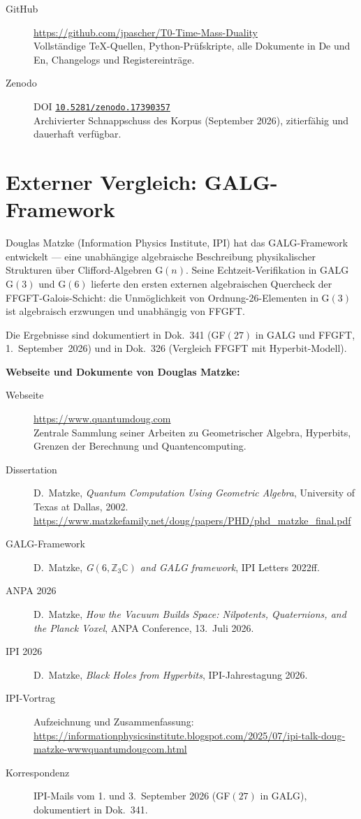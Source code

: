 \documentclass[11pt,oneside]{book}
\begin{document}
\begin{description}
  \item[GitHub] \url{https://github.com/jpascher/T0-Time-Mass-Duality}\\
    Vollständige TeX-Quellen, Python-Prüfskripte, alle Dokumente
    in De und En, Changelogs und Registereinträge.
  \item[Zenodo] DOI \href{https://doi.org/10.5281/zenodo.17390357}{\texttt{10.5281/zenodo.17390357}}\\
    Archivierter Schnappschuss des Korpus (September 2026),
    zitierfähig und dauerhaft verfügbar.
\end{description}

\section*{Externer Vergleich: GALG-Framework}

Douglas Matzke (Information Physics Institute, IPI) hat das GALG-Framework
entwickelt --- eine unabhängige algebraische Beschreibung physikalischer
Strukturen über Clifford-Algebren G$(n)$. Seine Echtzeit-Verifikation in
GALG G$(3)$ und G$(6)$ lieferte den ersten externen algebraischen
Quercheck der FFGFT-Galois-Schicht: die Unmöglichkeit von Ordnung-26-Elementen
in G$(3)$ ist algebraisch erzwungen und unabhängig von FFGFT.

Die Ergebnisse sind dokumentiert in Dok.~341 (GF$(27)$ in GALG und FFGFT,
1.~September~2026) und in Dok.~326 (Vergleich FFGFT mit Hyperbit-Modell).

\medskip\noindent\textbf{Webseite und Dokumente von Douglas Matzke:}
\begin{description}
  \item[Webseite] \url{https://www.quantumdoug.com}\\
    Zentrale Sammlung seiner Arbeiten zu Geometrischer Algebra, Hyperbits,
    Grenzen der Berechnung und Quantencomputing.
  \item[Dissertation] D.~Matzke, \textit{Quantum Computation Using Geometric Algebra},
    University of Texas at Dallas, 2002.\\
    \url{https://www.matzkefamily.net/doug/papers/PHD/phd_matzke_final.pdf}
  \item[GALG-Framework] D.~Matzke, \textit{G$(6,\mathbb{Z}_3\mathbb{C})$ and GALG framework},
    IPI Letters 2022ff.
  \item[ANPA 2026] D.~Matzke, \textit{How the Vacuum Builds Space: Nilpotents,
    Quaternions, and the Planck Voxel}, ANPA Conference, 13.~Juli 2026.
  \item[IPI 2026] D.~Matzke, \textit{Black Holes from Hyperbits}, IPI-Jahrestagung 2026.
  \item[IPI-Vortrag] Aufzeichnung und Zusammenfassung:\\
    \url{https://informationphysicsinstitute.blogspot.com/2025/07/ipi-talk-doug-matzke-wwwquantumdougcom.html}
  \item[Korrespondenz] IPI-Mails vom 1. und 3.~September 2026 (GF$(27)$ in GALG),
    dokumentiert in Dok.~341.
\end{description}
\end{document}
